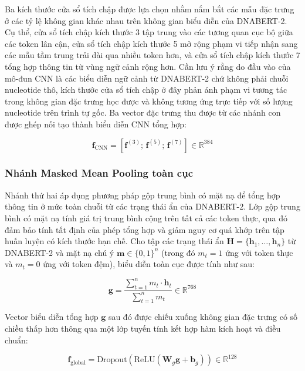 Ba kích thước cửa sổ tích chập được lựa chọn nhằm nắm bắt các mẫu đặc trưng ở các tỷ lệ không gian khác nhau trên không gian biểu diễn của DNABERT-2. Cụ thể, cửa sổ tích chập kích thước 3 tập trung vào các tương quan cục bộ giữa các token lân cận, cửa sổ tích chập kích thước 5 mở rộng phạm vi tiếp nhận sang các mẫu tầm trung trải dài qua nhiều token hơn, và cửa sổ tích chập kích thước 7 tổng hợp thông tin từ vùng ngữ cảnh rộng hơn. Cần lưu ý rằng do đầu vào của mô-đun CNN là các biểu diễn ngữ cảnh từ DNABERT-2 chứ không phải chuỗi nucleotide thô, kích thước cửa sổ tích chập ở đây phản ánh phạm vi tương tác trong không gian đặc trưng học được và không tương ứng trực tiếp với số lượng nucleotide trên trình tự gốc. Ba vector đặc trưng thu được từ các nhánh con được ghép nối tạo thành biểu diễn CNN tổng hợp:

\begin{equation}
    \mathbf{f}_{\text{CNN}} = \left[\mathbf{f}^{(3)};\, \mathbf{f}^{(5)};\, \mathbf{f}^{(7)}\right] \in \mathbb{R}^{384}
    \label{eq:cnn_concat}
\end{equation}

\subsubsection{Nhánh Masked Mean Pooling toàn cục}

Nhánh thứ hai áp dụng phương pháp gộp trung bình có mặt nạ để tổng hợp thông tin ở mức toàn chuỗi từ các trạng thái ẩn của DNABERT-2. Lớp gộp trung bình có mặt nạ tính giá trị trung bình cộng trên tất cả các token thực, qua đó đảm bảo tính tất định của phép tổng hợp và giảm nguy cơ quá khớp trên tập huấn luyện có kích thước hạn chế. Cho tập các trạng thái ẩn $\mathbf{H} = \{\mathbf{h}_1, \ldots, \mathbf{h}_n\}$ từ DNABERT-2 và mặt nạ chú ý $\mathbf{m} \in \{0, 1\}^n$ (trong đó $m_t = 1$ ứng với token thực và $m_t = 0$ ứng với token đệm), biểu diễn toàn cục được tính như sau:

\begin{equation}
    \mathbf{g} = \frac{\sum_{t=1}^{n} m_t \cdot \mathbf{h}_t}{\sum_{t=1}^{n} m_t} \in \mathbb{R}^{768}
    \label{eq:mean_pooling}
\end{equation}

Vector biểu diễn tổng hợp $\mathbf{g}$ sau đó được chiếu xuống không gian đặc trưng có số chiều thấp hơn thông qua một lớp tuyến tính kết hợp hàm kích hoạt và điều chuẩn:

\begin{equation}
    \mathbf{f}_{\text{global}} = \text{Dropout}\!\left(\text{ReLU}(\mathbf{W}_g \mathbf{g} + \mathbf{b}_g)\right) \in \mathbb{R}^{128}
    \label{eq:global_proj}
\end{equation}


